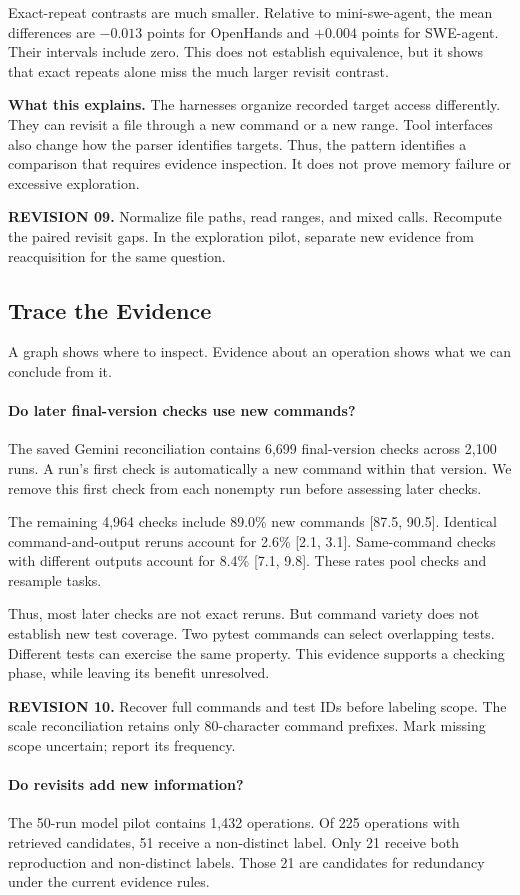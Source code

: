 \documentclass[10pt,a4paper,twocolumn]{article}
\newcommand{\rev}[2]{\par\smallskip\noindent\begin{minipage}{\linewidth}\color{revision}\footnotesize\textbf{REVISION #1.} #2\end{minipage}\par\smallskip}
\begin{document}
Exact-repeat contrasts are much smaller. Relative to mini-swe-agent, the mean differences are $-0.013$ points for OpenHands and $+0.004$ points for SWE-agent. Their intervals include zero. This does not establish equivalence, but it shows that exact repeats alone miss the much larger revisit contrast.

\textbf{What this explains.} The harnesses organize recorded target access differently. They can revisit a file through a new command or a new range. Tool interfaces also change how the parser identifies targets. Thus, the pattern identifies a comparison that requires evidence inspection. It does not prove memory failure or excessive exploration.
\rev{09}{Normalize file paths, read ranges, and mixed calls. Recompute the paired revisit gaps. In the exploration pilot, separate new evidence from reacquisition for the same question.}

\subsection{Trace the Evidence}
A graph shows where to inspect. Evidence about an operation shows what we can conclude from it.
\paragraph{Do later final-version checks use new commands?}
The saved Gemini reconciliation contains 6,699 final-version checks across 2,100 runs. A run's first check is automatically a new command within that version. We remove this first check from each nonempty run before assessing later checks.

The remaining 4,964 checks include 89.0\% new commands [87.5, 90.5]. Identical command-and-output reruns account for 2.6\% [2.1, 3.1]. Same-command checks with different outputs account for 8.4\% [7.1, 9.8]. These rates pool checks and resample tasks.

Thus, most later checks are not exact reruns. But command variety does not establish new test coverage. Two pytest commands can select overlapping tests. Different tests can exercise the same property. This evidence supports a checking phase, while leaving its benefit unresolved.
\rev{10}{Recover full commands and test IDs before labeling scope. The scale reconciliation retains only 80-character command prefixes. Mark missing scope uncertain; report its frequency.}

\paragraph{Do revisits add new information?}
The 50-run model pilot contains 1,432 operations. Of 225 operations with retrieved candidates, 51 receive a non-distinct label. Only 21 receive both reproduction and non-distinct labels. Those 21 are candidates for redundancy under the current evidence rules.
\end{document}

